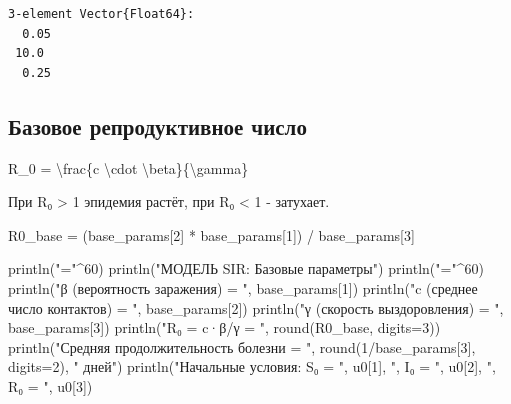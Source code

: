 \documentclass[
  12pt,
  a4paper,
  DIV=11,
  numbers=noendperiod]{scrreprt}
\newenvironment{Shaded}{\begin{snugshade}}{\end{snugshade}}
\newcommand{\FloatTok}[1]{\textcolor[rgb]{0.68,0.00,0.00}{#1}}
\newcommand{\FunctionTok}[1]{\textcolor[rgb]{0.28,0.35,0.67}{#1}}
\newcommand{\NormalTok}[1]{\textcolor[rgb]{0.00,0.23,0.31}{#1}}
\newcommand{\OperatorTok}[1]{\textcolor[rgb]{0.37,0.37,0.37}{#1}}
\newcommand{\StringTok}[1]{\textcolor[rgb]{0.13,0.47,0.30}{#1}}
\begin{document}
\begin{verbatim}
3-element Vector{Float64}:
  0.05
 10.0
  0.25
\end{verbatim}

\subsection{Базовое репродуктивное
число}\label{ux431ux430ux437ux43eux432ux43eux435-ux440ux435ux43fux440ux43eux434ux443ux43aux442ux438ux432ux43dux43eux435-ux447ux438ux441ux43bux43e}

\begin{Shaded}
\begin{Highlighting}[]
\NormalTok{R\_0 = \textbackslash{}frac\{c \textbackslash{}cdot \textbackslash{}beta\}\{\textbackslash{}gamma\}}
\end{Highlighting}
\end{Shaded}

При R₀ \textgreater{} 1 эпидемия растёт, при R₀ \textless{} 1 -
затухает.

\begin{Shaded}
\begin{Highlighting}[]
\NormalTok{R0\_base }\OperatorTok{=}\NormalTok{ (base\_params[}\FloatTok{2}\NormalTok{] }\OperatorTok{*}\NormalTok{ base\_params[}\FloatTok{1}\NormalTok{]) }\OperatorTok{/}\NormalTok{ base\_params[}\FloatTok{3}\NormalTok{]}

\FunctionTok{println}\NormalTok{(}\StringTok{"="}\OperatorTok{\^{}}\FloatTok{60}\NormalTok{)}
\FunctionTok{println}\NormalTok{(}\StringTok{"МОДЕЛЬ SIR: Базовые параметры"}\NormalTok{)}
\FunctionTok{println}\NormalTok{(}\StringTok{"="}\OperatorTok{\^{}}\FloatTok{60}\NormalTok{)}
\FunctionTok{println}\NormalTok{(}\StringTok{"β (вероятность заражения) = "}\NormalTok{, base\_params[}\FloatTok{1}\NormalTok{])}
\FunctionTok{println}\NormalTok{(}\StringTok{"c (среднее число контактов) = "}\NormalTok{, base\_params[}\FloatTok{2}\NormalTok{])}
\FunctionTok{println}\NormalTok{(}\StringTok{"γ (скорость выздоровления) = "}\NormalTok{, base\_params[}\FloatTok{3}\NormalTok{])}
\FunctionTok{println}\NormalTok{(}\StringTok{"R₀ = c·β/γ = "}\NormalTok{, }\FunctionTok{round}\NormalTok{(R0\_base, digits}\OperatorTok{=}\FloatTok{3}\NormalTok{))}
\FunctionTok{println}\NormalTok{(}\StringTok{"Средняя продолжительность болезни = "}\NormalTok{, }\FunctionTok{round}\NormalTok{(}\FloatTok{1}\OperatorTok{/}\NormalTok{base\_params[}\FloatTok{3}\NormalTok{], digits}\OperatorTok{=}\FloatTok{2}\NormalTok{), }\StringTok{" дней"}\NormalTok{)}
\FunctionTok{println}\NormalTok{(}\StringTok{"Начальные условия: S₀ = "}\NormalTok{, u0[}\FloatTok{1}\NormalTok{], }\StringTok{", I₀ = "}\NormalTok{, u0[}\FloatTok{2}\NormalTok{], }\StringTok{", R₀ = "}\NormalTok{, u0[}\FloatTok{3}\NormalTok{])}
\end{Highlighting}
\end{Shaded}
\end{document}
